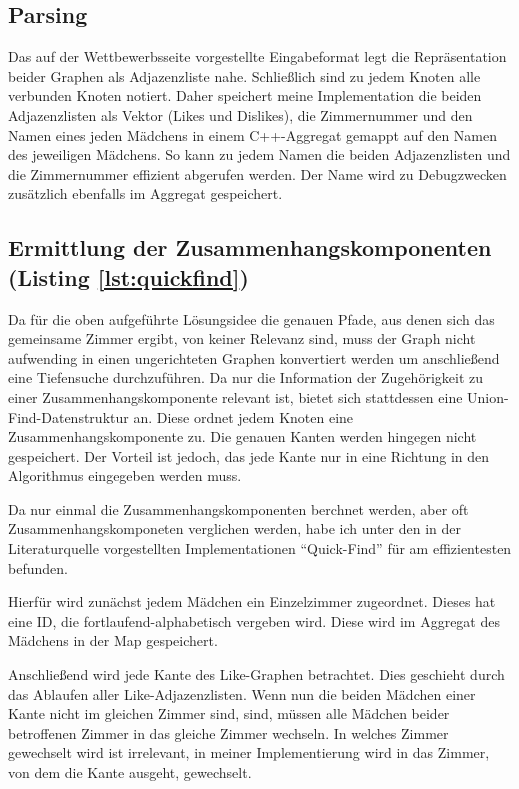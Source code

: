 \subsection{Parsing}
Das auf der Wettbewerbsseite vorgestellte Eingabeformat legt die Repräsentation beider Graphen als Adjazenzliste nahe. Schließlich sind zu jedem Knoten alle verbunden Knoten notiert.
Daher speichert meine Implementation die beiden Adjazenzlisten als Vektor (Likes und Dislikes), die Zimmernummer und den Namen eines jeden Mädchens in einem C++-Aggregat gemappt auf den Namen des jeweiligen Mädchens.
So kann zu jedem Namen die beiden Adjazenzlisten und die Zimmernummer effizient abgerufen werden. Der Name wird zu Debugzwecken zusätzlich ebenfalls im Aggregat gespeichert.

\subsection{Ermittlung der Zusammenhangskomponenten (Listing \ref{lst:quickfind})}
Da für die oben aufgeführte Lösungsidee die genauen Pfade, aus denen sich das gemeinsame Zimmer ergibt, von keiner Relevanz sind, muss der Graph nicht aufwending in einen ungerichteten Graphen konvertiert werden um anschließend eine Tiefensuche durchzuführen.
Da nur die Information der Zugehörigkeit zu einer Zusammenhangskomponente relevant ist, bietet sich stattdessen eine Union-Find-Datenstruktur\autocite[S. 238]{Sedgewick2014} an.
Diese ordnet jedem Knoten eine Zusammenhangskomponente zu. Die genauen Kanten werden hingegen nicht gespeichert.
Der Vorteil ist jedoch, das jede Kante nur in eine Richtung in den Algorithmus eingegeben werden muss.

Da nur einmal die Zusammenhangskomponenten berchnet werden, aber oft Zusammenhangskomponeten verglichen werden, habe ich unter den in der Literaturquelle vorgestellten Implementationen "`Quick-Find"'\autocite[S. 245]{Sedgewick2014} für am effizientesten befunden.

Hierfür wird zunächst jedem Mädchen ein Einzelzimmer zugeordnet. Dieses hat eine ID, die fortlaufend-alphabetisch vergeben wird. Diese wird im Aggregat des Mädchens in der Map gespeichert.

Anschließend wird jede Kante des Like-Graphen betrachtet. Dies geschieht durch das Ablaufen aller Like-Adjazenzlisten. Wenn nun die beiden Mädchen einer Kante nicht im gleichen Zimmer sind, sind, müssen alle Mädchen beider betroffenen Zimmer in das gleiche Zimmer wechseln. In welches Zimmer gewechselt wird ist irrelevant, in meiner Implementierung wird in das Zimmer, von dem die Kante ausgeht, gewechselt.

